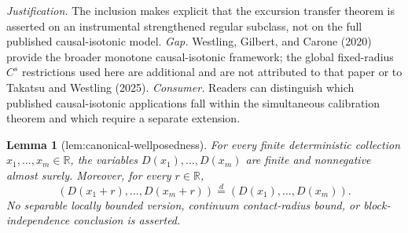 \documentclass{article}
\newtheorem{lemma}{Lemma}
\begin{document}
\par\smallskip\noindent \textit{Justification.} The inclusion makes explicit that the excursion transfer theorem is asserted on an instrumental strengthened regular subclass, not on the full published causal-isotonic model. \textit{Gap.} Westling, Gilbert, and Carone (2020) provide the broader monotone causal-isotonic framework; the global fixed-radius \(C^s\) restrictions used here are additional and are not attributed to that paper or to Takatsu and Westling (2025). \textit{Consumer.} Readers can distinguish which published causal-isotonic applications fall within the simultaneous calibration theorem and which require a separate extension.

\begin{lemma}[lem:canonical-wellposedness]\label{lem:canonical-wellposedness}
For every finite deterministic collection \(x_1,\ldots,x_m\in\mathbb R\), the variables \(D(x_1),\ldots,D(x_m)\) are finite and nonnegative almost surely. Moreover, for every \(r\in\mathbb R\),
\[
 (D(x_1+r),\ldots,D(x_m+r))\stackrel{d}{=}(D(x_1),\ldots,D(x_m)).
\]
No separable locally bounded version, continuum contact-radius bound, or block-independence conclusion is asserted.
\end{lemma}
\end{document}
